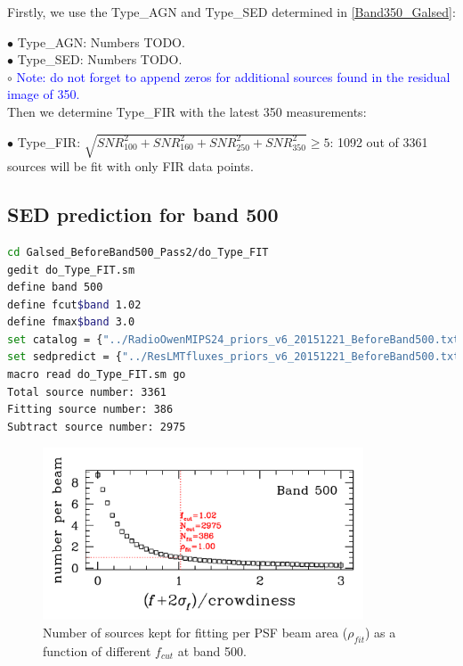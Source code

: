 \documentclass[11pt,a4paper]{article}
\begin{document}
Firstly, we use the Type\_AGN and Type\_SED determined in \ref{Band350_Galsed}:

\indent\hspace{15pt}$\bullet$ 
Type\_AGN: Numbers TODO. 
\\
\indent\hspace{15pt}$\bullet$ 
Type\_SED: Numbers TODO. 
\\
\indent\hspace{15pt}$\circ$ 
\textcolor{blue}{Note: \textcolor{blue}{do not forget} to append zeros for additional sources found in the residual image of 350.}
\\

Then we determine Type\_FIR with the latest 350 measurements:

\indent\hspace{15pt}$\bullet$ 
Type\_FIR: $\sqrt{SNR_{100}^2+SNR_{160}^2+SNR_{250}^2+SNR_{350}^2} \ge 5$: 1092 out of 3361 sources will be fit with only FIR data points. 
\\

\subsection{SED prediction for band 500}
\label{Band500_Galpre}

\begin{lstlisting}[language=bash]
cd Galsed_BeforeBand500_Pass2/do_Type_FIT
gedit do_Type_FIT.sm
define band 500
define fcut$band 1.02
define fmax$band 3.0
set catalog = {"../RadioOwenMIPS24_priors_v6_20151221_BeforeBand500.txt"}
set sedpredict = {"../ResLMTfluxes_priors_v6_20151221_BeforeBand500.txt"}
macro read do_Type_FIT.sm go
Total source number: 3361
Fitting source number: 386
Subtract source number: 2975
\end{lstlisting}

\begin{figure}[H]
	\caption{Number of sources kept for fitting per PSF beam area ($\rho_{fit}$) as a function of different $f_{cut}$ at band 500.}
	\includegraphics[width=0.85\textwidth]{plot_cutting_flux_500_with_crow}
\end{figure}
\end{document}
